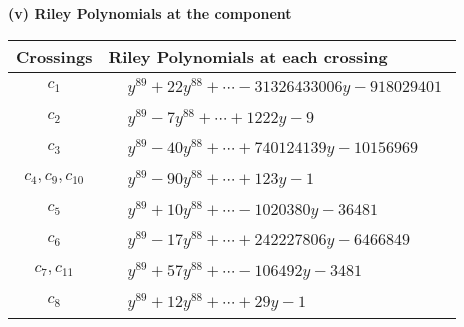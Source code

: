\documentclass[1p]{elsarticle_modified}
\theoremstyle{definition}
\begin{document}
\newpage\renewcommand{\arraystretch}{1}
\flushleft \textbf{(v) Riley Polynomials at the component}\newline \\
\begin{tabular}{m{50pt}|m{274pt}}
Crossings & \hspace{64pt}Riley Polynomials at each crossing \\
\hline $$\begin{aligned}c_{1}\end{aligned}$$&$\begin{aligned}
&y^{89}+22 y^{88}+\cdots-31326433006 y-918029401
\end{aligned}$\\
\hline $$\begin{aligned}c_{2}\end{aligned}$$&$\begin{aligned}
&y^{89}-7 y^{88}+\cdots+1222 y-9
\end{aligned}$\\
\hline $$\begin{aligned}c_{3}\end{aligned}$$&$\begin{aligned}
&y^{89}-40 y^{88}+\cdots+740124139 y-10156969
\end{aligned}$\\
\hline $$\begin{aligned}c_{4},c_{9},c_{10}\end{aligned}$$&$\begin{aligned}
&y^{89}-90 y^{88}+\cdots+123 y-1
\end{aligned}$\\
\hline $$\begin{aligned}c_{5}\end{aligned}$$&$\begin{aligned}
&y^{89}+10 y^{88}+\cdots-1020380 y-36481
\end{aligned}$\\
\hline $$\begin{aligned}c_{6}\end{aligned}$$&$\begin{aligned}
&y^{89}-17 y^{88}+\cdots+242227806 y-6466849
\end{aligned}$\\
\hline $$\begin{aligned}c_{7},c_{11}\end{aligned}$$&$\begin{aligned}
&y^{89}+57 y^{88}+\cdots-106492 y-3481
\end{aligned}$\\
\hline $$\begin{aligned}c_{8}\end{aligned}$$&$\begin{aligned}
&y^{89}+12 y^{88}+\cdots+29 y-1
\end{aligned}$\\
\hline
\end{tabular}\\~\\
\end{document}
